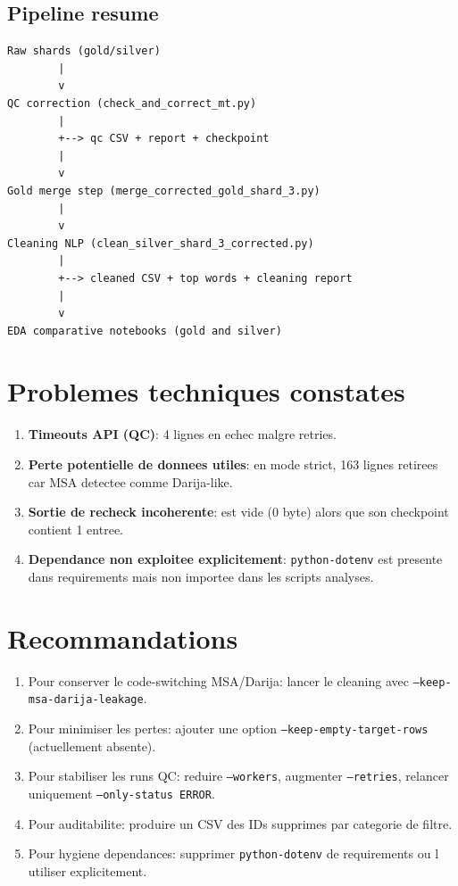 \documentclass[11pt,a4paper]{article}
\begin{document}
\subsection{Pipeline resume}
\begin{lstlisting}
Raw shards (gold/silver)
        |
        v
QC correction (check_and_correct_mt.py)
        |
        +--> qc CSV + report + checkpoint
        |
        v
Gold merge step (merge_corrected_gold_shard_3.py)
        |
        v
Cleaning NLP (clean_silver_shard_3_corrected.py)
        |
        +--> cleaned CSV + top words + cleaning report
        |
        v
EDA comparative notebooks (gold and silver)
\end{lstlisting}

\section{Problemes techniques constates}
\begin{enumerate}[leftmargin=*]
  \item \textbf{Timeouts API (QC)}: 4 lignes en echec malgre retries.
  \item \textbf{Perte potentielle de donnees utiles}: en mode strict, 163 lignes retirees car MSA detectee comme Darija-like.
  \item \textbf{Sortie de recheck incoherente}:  est vide (0 byte) alors que son checkpoint contient 1 entree.
  \item \textbf{Dependance non exploitee explicitement}: \texttt{python-dotenv} est presente dans requirements mais non importee dans les scripts analyses.
\end{enumerate}

\section{Recommandations}
\begin{enumerate}[leftmargin=*]
  \item Pour conserver le code-switching MSA/Darija: lancer le cleaning avec \texttt{--keep-msa-darija-leakage}.
  \item Pour minimiser les pertes: ajouter une option \texttt{--keep-empty-target-rows} (actuellement absente).
  \item Pour stabiliser les runs QC: reduire \texttt{--workers}, augmenter \texttt{--retries}, relancer uniquement \texttt{--only-status ERROR}.
  \item Pour auditabilite: produire un CSV des IDs supprimes par categorie de filtre.
  \item Pour hygiene dependances: supprimer \texttt{python-dotenv} de requirements ou l utiliser explicitement.
\end{enumerate}
\end{document}
